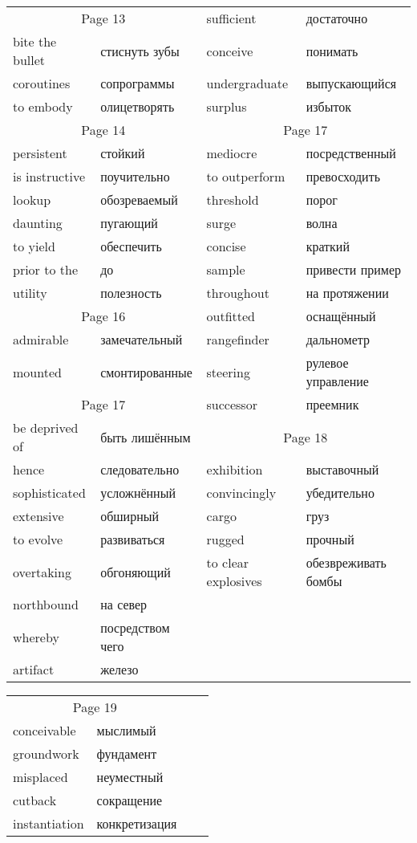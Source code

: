 \documentclass[12pt]{article}
\begin{document}
\begin{tabular}{| l l | l l | }
  \cline{1-2}\multicolumn{2}{|c|}{Page 13} & sufficient & достаточно \\
  bite the bullet & стиснуть зубы & conceive & понимать \\
  coroutines & сопрограммы & undergraduate & выпускающийся \\
  to embody & олицетворять & surplus & избыток \\

  \cline{1-2} \multicolumn{2}{|c|}{Page 14} & \multicolumn{2}{c|}{Page 17} \\
  persistent & стойкий & mediocre & посредственный \\
  is instructive & поучительно & to outperform & превосходить \\
  lookup & обозреваемый & threshold & порог \\
  daunting & пугающий & surge & волна \\
  to yield & обеспечить & concise & краткий \\
  prior to the & до & sample & привести пример \\
  utility & полезность & throughout & на протяжении \\

  \cline{1-2}\multicolumn{2}{|c|}{Page 16} & outfitted & оснащённый \\
  admirable & замечательный & rangefinder & дальнометр \\
  mounted & смонтированные & steering & рулевое управление \\

  \cline{1-2} \multicolumn{2}{|c|}{Page 17} &  successor & преемник \\ \cline{3-4}
  be deprived of & быть лишённым & \multicolumn{2}{c|}{Page 18} \\
  hence & следовательно & exhibition & выставочный \\
  sophisticated & усложнённый & convincingly & убедительно \\
  extensive & обширный & cargo & груз \\
  to evolve & развиваться & rugged & прочный \\
  overtaking & обгоняющий & to clear explosives & обезвреживать бомбы \\
  northbound & на север \\
  whereby & посредством чего \\
  artifact & железо \\
  
  
  \hline

\end{tabular}



\begin{tabular}{| l l | l l | }
  \hline
  \multicolumn{2}{|c|}{Page 19} \\
  conceivable & мыслимый \\
  groundwork & фундамент \\
  misplaced & неуместный \\
  cutback & сокращение \\
  instantiation & конкретизация  \\



  
  
  \hline

\end{tabular}
\end{document}
